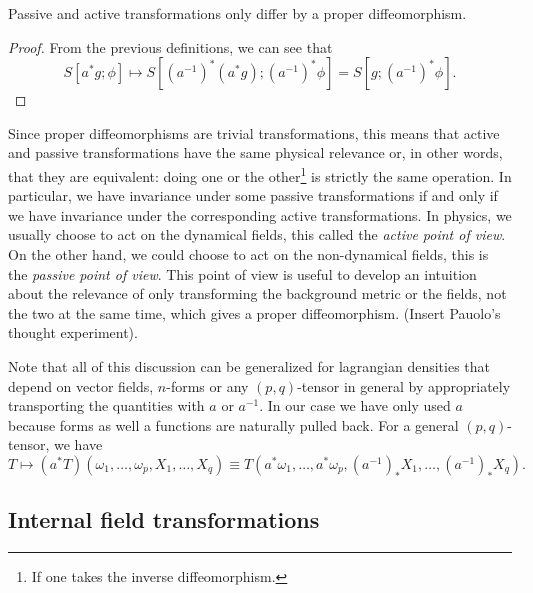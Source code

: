 \documentclass[a4paper,10pt]{article}
\begin{document}
        \begin{prop}
            Passive and active transformations only differ by a proper diffeomorphism.
        \end{prop}
        \begin{proof}
            From the previous definitions, we can see that
        \begin{equation}
            S[a^*g;\phi]\mapsto S[(a^{-1})^*(a^*g);(a^{-1})^*\phi]=S[g;(a^{-1})^*\phi].
        \end{equation}
        \end{proof}
        Since proper diffeomorphisms are trivial transformations, this means that active and passive transformations have the same physical relevance or, in other words, that they are equivalent: doing one or the other\footnote{If one takes the inverse diffeomorphism.} is strictly the same operation. In particular, we have invariance under some passive transformations if and only if we have invariance under the corresponding active transformations. In physics, we usually choose to act on the dynamical fields, this called the \emph{active point of view}. On the other hand, we could choose to act on the non-dynamical fields, this is the \emph{passive point of view}. This point of view is useful to develop an intuition about the relevance of only transforming the background metric or the fields, not the two at the same time, which gives a proper diffeomorphism. (Insert Pauolo's thought experiment).
        
        Note that all of this discussion can be generalized for lagrangian densities that depend on vector fields, $n$-forms or any $(p,q)$-tensor in general by appropriately transporting the quantities with $a$ or $a^{-1}$. In our case we have only used $a$ because forms as well a functions are naturally pulled back. For a general $(p,q)$-tensor, we have
        \begin{equation}
            T\mapsto (a^*T)(\omega_1,\dots,\omega_p,X_1,\dots,X_q)\equiv T(a^*\omega_1,\dots,a^*\omega_p,(a^{-1})_*X_1,\dots,(a^{-1})_*X_q).
        \end{equation}

    \subsection{Internal field transformations}
\end{document}
